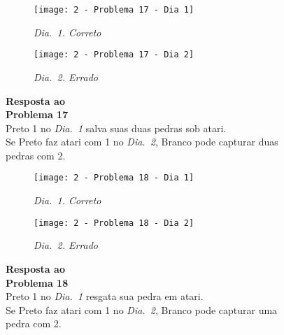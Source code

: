 \begin{SCfigure}[][h!]
    \begin{subfigure}[t]{.31\textwidth}
        \texttt{[image: 2 - Problema 17 - Dia 1]}
        \caption*{\emph{Dia.\@~1. Correto}}
    \end{subfigure}
    \hfill
    \begin{subfigure}[t]{.31\textwidth}
        \texttt{[image: 2 - Problema 17 - Dia 2]}
        \caption*{\emph{Dia.\@~2. Errado}}
    \end{subfigure}
    \hfill
    \caption*{\textbf{Resposta ao\\Problema 17}\\\vspace*{.25cm}Preto 1 no \emph{Dia.\@~1} salva suas duas pedras sob atari.\\\vspace*{.25cm}Se Preto faz atari com 1 no \emph{Dia.\@~2}, Branco pode capturar duas pedras com 2.}
\end{SCfigure}

\vfill

\begin{SCfigure}[][h!]
    \begin{subfigure}[t]{.31\textwidth}
        \texttt{[image: 2 - Problema 18 - Dia 1]}
        \caption*{\emph{Dia.\@~1. Correto}}
    \end{subfigure}
    \hfill
    \begin{subfigure}[t]{.31\textwidth}
        \texttt{[image: 2 - Problema 18 - Dia 2]}
        \caption*{\emph{Dia.\@~2. Errado}}
    \end{subfigure}
    \hfill
    \caption*{\textbf{Resposta ao\\Problema 18}\\\vspace*{.25cm}Preto 1 no \emph{Dia.\@~1} resgata sua pedra em atari.\\\vspace*{.25cm}Se Preto faz atari com 1 no \emph{Dia.\@~2}, Branco pode capturar uma pedra com 2.}
\end{SCfigure}

\pagebreak


